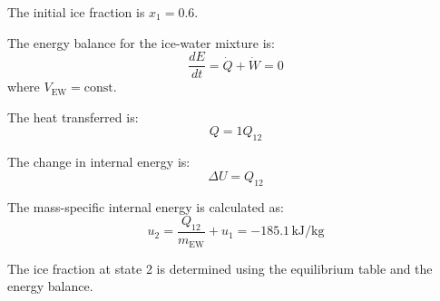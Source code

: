 The initial ice fraction is \( x_1 = 0.6 \).  

The energy balance for the ice-water mixture is:  
\[
\frac{dE}{dt} = \dot{Q} + \dot{W} = 0
\]  
where \( V_{\text{EW}} = \text{const} \).  

The heat transferred is:  
\[
Q = 1 Q_{12}
\]  

The change in internal energy is:  
\[
\Delta U = Q_{12}
\]  

The mass-specific internal energy is calculated as:  
\[
u_2 = \frac{Q_{12}}{m_{\text{EW}}} + u_1 = -185.1 \, \text{kJ/kg}
\]  

The ice fraction at state 2 is determined using the equilibrium table and the energy balance.